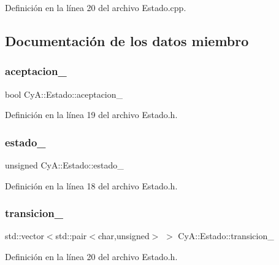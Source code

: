 Definición en la línea 20 del archivo Estado.\+cpp.



\subsection{Documentación de los datos miembro}
\mbox{\label{class_cy_a_1_1_estado_a7952d333fb3611d3abcf605d8ed0177a}} 
\subsubsection{\texorpdfstring{aceptacion\+\_\+}{aceptacion\_}}
{\footnotesize\ttfamily bool Cy\+A\+::\+Estado\+::aceptacion\+\_\+}



Definición en la línea 19 del archivo Estado.\+h.

\mbox{\label{class_cy_a_1_1_estado_a302d42b269605feb9ab837d4c952d871}} 
\subsubsection{\texorpdfstring{estado\+\_\+}{estado\_}}
{\footnotesize\ttfamily unsigned Cy\+A\+::\+Estado\+::estado\+\_\+}



Definición en la línea 18 del archivo Estado.\+h.

\mbox{\label{class_cy_a_1_1_estado_a8eea41e8dba3f84a191d3a4a6a120006}} 
\subsubsection{\texorpdfstring{transicion\+\_\+}{transicion\_}}
{\footnotesize\ttfamily std\+::vector$<$std\+::pair$<$char,unsigned$>$ $>$ Cy\+A\+::\+Estado\+::transicion\+\_\+}



Definición en la línea 20 del archivo Estado.\+h.

